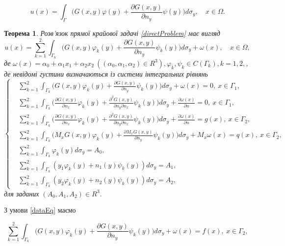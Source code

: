\documentclass[12pt]{article}
\newtheorem{theorem}{Теорема}
\begin{document}
\begin{equation}
	 	u(x)=\int_{\Gamma}\bigg(G(x,y)\varphi(y)+\frac{\partial G(x,y)}{\partial n_y}\psi(y)\bigg)d\sigma_y, \quad x\in \Omega. \nonumber
\end{equation}

\begin{theorem}
Розв'язок прямої крайової задачі \eqref{directProblem} має вигляд
	 \begin{equation}
	 	u(x)=\sum_{k=1}^{2}\int_{\Gamma_k}\bigg(G(x,y)\varphi_k(y)+\frac{\partial G(x,y)}{\partial n_y}\psi_k(y)\bigg)d\sigma_y+\omega(x), \quad x\in \Omega,
	 \end{equation}
	 де $\omega(x) = \alpha_0+\alpha_1x_1+\alpha_2x_2 \ ((\alpha_0,\alpha_1,\alpha_2)\in R^3), \varphi_k,\psi_k\in C(\Gamma_k), k=1,2,$, де невідомі густини визначаються із системи інтегральних рівнянь
	 \begin{equation}
	 \left\{
	 	\begin{split}
		\label{system}
	 		&\sum_{k=1}^{2}\int_{\Gamma_k}\bigg(G(x,y)\varphi_k(y)+\frac{\partial G(x,y)}{\partial n_y}\psi_k(y)\bigg)d\sigma_y+\omega(x)=0, \ x\in\Gamma_1, \\
			&\sum_{k=1}^{2}\int_{\Gamma_k}\bigg(\frac{\partial G(x,y)}{\partial n_x}\varphi_k(y)+\frac{\partial^2 G(x,y)}{\partial n_y\partial n_x}\psi_k(y)\bigg)d\sigma_y+\frac{\partial\omega(x)}{\partial n}=0, \ x\in\Gamma_1, \\
			&\sum_{k=1}^{2}\int_{\Gamma_k}\bigg(\frac{\partial G(x,y)}{\partial n_x}\varphi_k(y)+\frac{\partial^2 G(x,y)}{\partial n_y\partial n_x}\psi_k(y)\bigg)d\sigma_y+\frac{\partial\omega(x)}{\partial n}=g(x), \ x\in\Gamma_2, \\
			&\sum_{k=1}^{2}\int_{\Gamma_k}\bigg(M_x G(x,y)\varphi_k(y)+\frac{\partial M_x G(x,y)}{\partial n_y}\psi_k(y)\bigg)d\sigma_y+M_x\omega(x)=q(x), \ x\in\Gamma_2, \\
			&\sum_{k=1}^{2}\int_{\Gamma_k}\varphi_k(y)d\sigma_y=A_0, \\
			&\sum_{k=1}^{2}\int_{\Gamma_k}(y_1\varphi_k(y)+n_1(y)\psi_k(y))d\sigma_y=A_1, \\
			&\sum_{k=1}^{2}\int_{\Gamma_k}(y_2\varphi_k(y)+n_2(y)\psi_k(y))d\sigma_y=A_2,
		\end{split}
	\right.
	 \end{equation}
	для заданих $(A_0,A_1,A_2)\in R^3$.
 \end{theorem}

З умови \eqref{dataEq} маємо

 \begin{equation}
	\label{eq}
	 \sum_{k=1}^{2}\int_{\Gamma_k}\bigg(G(x,y)\varphi_k(y)+\frac{\partial G(x,y)}{\partial n_y}\psi_k(y)\bigg)d\sigma_y+\omega(x)=f(x), \ x\in\Gamma_2, 
\end{equation}
\end{document}
